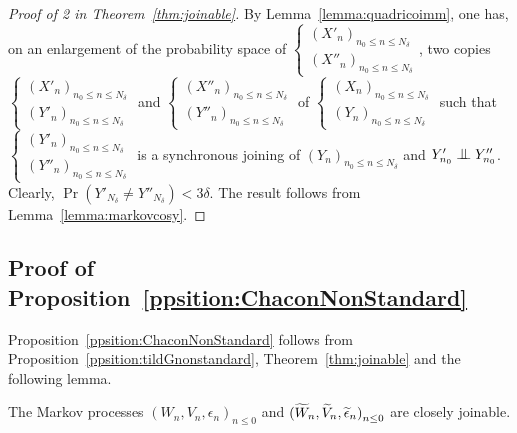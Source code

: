 \documentclass[12pt,a4paper]{article}
\begin{document}
\begin{proof}[Proof of 2 in Theorem~\ref{thm:joinable}]
By Lemma~\ref{lemma:quadricoimm}, 
one has, on an enlargement of the probability space of 
$\left\{\begin{smallmatrix} {(X'_n)}_{n_0 \leq n \leq N_\delta} \\ 
{(X''_n)}_{n_0 \leq n \leq N_\delta}
\end{smallmatrix}\right.$, two copies 
$\left\{\begin{smallmatrix} {(X'_n)}_{n_0 \leq n \leq N_\delta} \\ 
{(Y'_n)}_{n_0 \leq n \leq N_\delta}
\end{smallmatrix}\right.$ and 
$\left\{\begin{smallmatrix} {(X''_n)}_{n_0 \leq n \leq N_\delta} \\ 
{(Y''_n)}_{n_0 \leq n \leq N_\delta}
\end{smallmatrix}\right.$
of 
$\left\{\begin{smallmatrix} {(X_n)}_{n_0 \leq n \leq N_\delta} \\ 
{(Y_n)}_{n_0 \leq n \leq N_\delta}
\end{smallmatrix}\right.$ 
such that 
$\left\{\begin{smallmatrix} {(Y'_n)}_{n_0 \leq n \leq N_\delta} \\ 
{(Y''_n)}_{n_0 \leq n \leq N_\delta}
\end{smallmatrix}\right.$ is a synchronous joining of 
${(Y_n)}_{n_0 \leq n \leq N_\delta}$ and 
$Y'_{n_0} \indep Y''_{n_0}$. 
Clearly,  $\Pr(Y'_{N_\delta} \neq Y''_{N_\delta}) < 3\delta$. 
The result follows from Lemma~\ref{lemma:markovcosy}.
\end{proof}


\subsection{Proof of Proposition~\ref{ppsition:ChaconNonStandard}}

Proposition~\ref{ppsition:ChaconNonStandard} follows from 
Proposition~\ref{ppsition:tildGnonstandard}, Theorem~\ref{thm:joinable} and 
the following lemma. 

\begin{lemma}\label{lemma:joinable}
The Markov processes ${(W_n, V_n, \epsilon_n)}_{n \leq 0}$ 
and ${(\widetilde{W}_n, \widetilde{V}_n, \widetilde{\epsilon}_n)}_{n \leq 0}$ are closely joinable.
\end{lemma}
\end{document}

